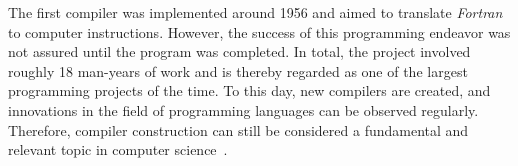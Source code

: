 The first compiler was implemented around 1956 and aimed to translate \emph{Fortran} to computer instructions.
However, the success of this programming endeavor was not assured until the program was completed.
In total, the project involved roughly 18 man-years of work
and is thereby regarded as one of the largest programming projects of the time.
To this day, new compilers are created, and innovations in the field of programming languages can be observed regularly.
Therefore, compiler construction can still be considered a fundamental and relevant topic in computer science~\cite[p.~6]{wirth_compiler_construction_2005}.
